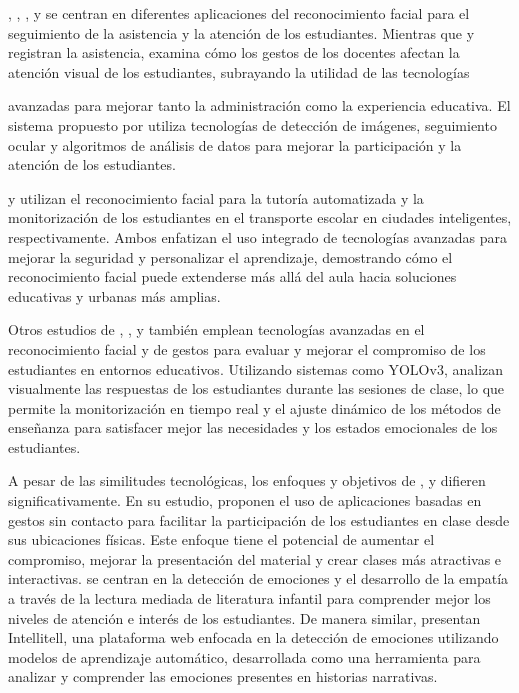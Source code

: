 \documentclass[a4paper,fleqn]{cas-sc}
\begin{document}
	\cite{Kulkarni2023}, \cite{Narkhede2023}, \cite{Farsani2020}, y \cite{Kumar2024Zoom} se centran en diferentes aplicaciones del reconocimiento facial para el seguimiento de la asistencia y la atención de los estudiantes. Mientras que \cite{Kulkarni2023} y \cite{Narkhede2023} registran la asistencia, \cite{Farsani2020} examina cómo los gestos de los docentes afectan la atención visual de los estudiantes, subrayando la utilidad de las tecnologías
	
	avanzadas para mejorar tanto la administración como la experiencia educativa. El sistema propuesto por \cite{Kumar2024Zoom} utiliza tecnologías de detección de imágenes, seguimiento ocular y algoritmos de análisis de datos para mejorar la participación y la atención de los estudiantes.
	
	\cite{Boumiza2017} y \cite{DaCosta2023} utilizan el reconocimiento facial para la tutoría automatizada y la monitorización de los estudiantes en el transporte escolar en ciudades inteligentes, respectivamente. Ambos enfatizan el uso integrado de tecnologías avanzadas para mejorar la seguridad y personalizar el aprendizaje, demostrando cómo el reconocimiento facial puede extenderse más allá del aula hacia soluciones educativas y urbanas más amplias.
	
	Otros estudios de \cite{Riquelme2013}, \cite{Nguyen2019}, y \cite{Argel2023Intellitell} también emplean tecnologías avanzadas en el reconocimiento facial y de gestos para evaluar y mejorar el compromiso de los estudiantes en entornos educativos. Utilizando sistemas como YOLOv3, analizan visualmente las respuestas de los estudiantes durante las sesiones de clase, lo que permite la monitorización en tiempo real y el ajuste dinámico de los métodos de enseñanza para satisfacer mejor las necesidades y los estados emocionales de los estudiantes.
	
	A pesar de las similitudes tecnológicas, los enfoques y objetivos de \cite{Erazo2016Easing}, \cite{Nguyen2019} y \cite{Riquelme2013} difieren significativamente. En su estudio, \cite{Erazo2016Easing} proponen el uso de aplicaciones basadas en gestos sin contacto para facilitar la participación de los estudiantes en clase desde sus ubicaciones físicas. Este enfoque tiene el potencial de aumentar el compromiso, mejorar la presentación del material y crear clases más atractivas e interactivas.
	\cite{Nguyen2019} se centran en la detección de emociones y el desarrollo de la empatía a través de la lectura mediada de literatura infantil para comprender mejor los niveles de atención e interés de los estudiantes. De manera similar, \cite{Argel2023Intellitell} presentan Intellitell, una plataforma web enfocada en la detección de emociones utilizando modelos de aprendizaje automático, desarrollada como una herramienta para analizar y comprender las emociones presentes en historias narrativas.
	
\end{document}
